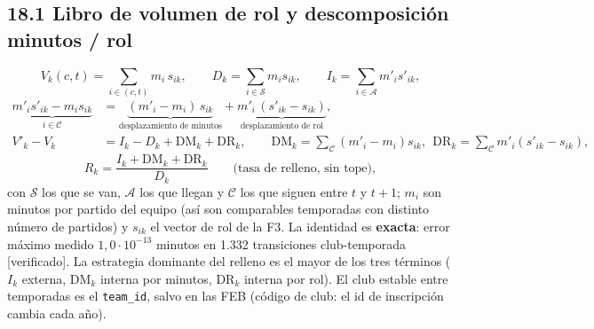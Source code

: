 \documentclass[10pt,a4paper]{article}
\begin{document}
\subsection*{18.1 Libro de volumen de rol y descomposición minutos / rol}
\[
V_k(c,t) = \sum_{i \in (c,t)} m_i\, s_{ik}, \qquad D_k = \sum_{i \in \mathcal S} m_i s_{ik}, \qquad I_k = \sum_{i \in \mathcal A} m'_i s'_{ik},
\]
\[
\begin{aligned} \underbrace{m'_i s'_{ik} - m_i s_{ik}}_{i \in \mathcal C} &= \underbrace{(m'_i - m_i)\,s_{ik}}_{\text{desplazamiento de minutos}} + \underbrace{m'_i\,(s'_{ik} - s_{ik})}_{\text{desplazamiento de rol}},\\ V'_k - V_k &= I_k - D_k + \mathrm{DM}_k + \mathrm{DR}_k, \qquad \mathrm{DM}_k = \textstyle\sum_{\mathcal C}(m'_i - m_i)s_{ik},\ \ \mathrm{DR}_k = \sum_{\mathcal C} m'_i(s'_{ik} - s_{ik}) , \end{aligned}
\]
\[
R_k = \frac{I_k + \mathrm{DM}_k + \mathrm{DR}_k}{D_k} \qquad \text{(tasa de relleno, sin tope)},
\]
con $\mathcal S$ los que se van, $\mathcal A$ los que llegan y $\mathcal C$ los que siguen entre $t$ y $t+1$; $m_i$ son minutos por partido del equipo (así son comparables temporadas con distinto número de partidos) y $s_{ik}$ el vector de rol de la F3. La identidad es \textbf{exacta}: error máximo medido $1{,}0\cdot 10^{-13}$ minutos en 1.332 transiciones club-temporada [verificado]. La estrategia dominante del relleno es el mayor de los tres términos ($I_k$ externa, $\mathrm{DM}_k$ interna por minutos, $\mathrm{DR}_k$ interna por rol). El club estable entre temporadas es el \texttt{team\_id}, salvo en las FEB (código de club: el id de inscripción cambia cada año).
\end{document}
